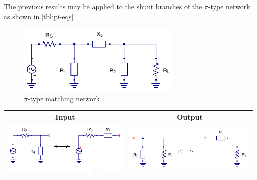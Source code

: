 \noindent The previous results may be applied to the shunt branches of the $\pi$-type network as shown in \ref{tbl:pi-eqs}

\begin{figure}[H]
\centering
\includegraphics[width=80mm]{./images/Synthesis/Impedance_Matching/pi-type-network}
\caption{$\pi$-type matching network}
\label{fig:pi-matching}
\end{figure}

\begin{table}[H]
  \centering
  \begin{tabular}{ | c | c | }
    \hline
    Input & Output\\ \hline
    \begin{minipage}{.4\textwidth}
      \includegraphics[width=\linewidth]{./images/Synthesis/Impedance_Matching/pi-type-input-transform}
    \end{minipage}
    &
    \begin{minipage}{.4\textwidth}
      \includegraphics[width=\linewidth]{./images/Synthesis/Impedance_Matching/pi-type-output-transform}
    \end{minipage}
    \\ \hline

\end{tabular}
\end{table}
